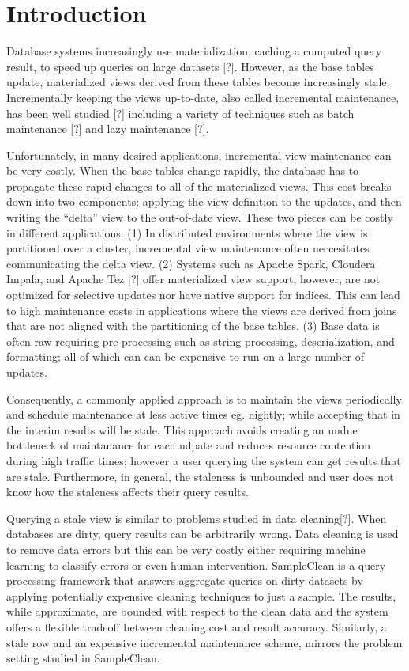 \section{Introduction}
Database systems increasingly use materialization, caching a computed
query result, to speed up queries on large datasets {[}?{]}. 
However, as the base tables update, materialized views derived from these tables
become increasingly stale. Incrementally keeping the views up-to-date,
also called incremental maintenance, has been well studied {[}?{]}
including a variety of techniques such as batch maintenance {[}?{]}
and lazy maintenance {[}?{]}. 

Unfortunately, in many desired applications, incremental view maintenance
can be very costly. 
When the base tables change rapidly, the database has to propagate these rapid changes to
all of the materialized views.  
This cost breaks down into two components: applying
the view definition to the updates, and then writing the ``delta''
view to the out-of-date view. These two pieces can be costly in different
applications. (1) In distributed environments where the view is partitioned
over a cluster, incremental view maintenance often neccesitates communicating
the delta view. (2) Systems such as Apache Spark, Cloudera Impala,
and Apache Tez {[}?{]} offer materialized view support, however, are
not optimized for selective updates nor have native support for indices.
This can lead to high maintenance costs in applications where the
views are derived from joins that are not aligned with the partitioning
of the base tables. (3) Base data is often raw requiring pre-processing
such as string processing, deserialization, and formatting; all of
which can can be expensive to run on a large number of updates. 

Consequently, a commonly applied approach is to maintain the views periodically and
schedule maintenance at less active times eg. nightly; while accepting
that in the interim results will be stale. This approach avoids creating
an undue bottleneck of maintanance for each udpate and reduces resource contention during high traffic times; 
however a user querying the system can get results that are stale.
Furthermore, in general, the staleness is unbounded and user does not know how the staleness affects their query results.

Querying a stale view is similar to problems studied in data cleaning{[}?{]}.
When databases are dirty, query results can be arbitrarily wrong.
Data cleaning is used to remove data errors but this can be very costly either 
requiring machine learning to classify errors or even human intervention.
SampleClean is a query processing framework that answers aggregate
queries on dirty datasets by applying potentially expensive cleaning
techniques to just a sample. The results, while approximate, are bounded
with respect to the clean data and the system offers a flexible tradeoff
between cleaning cost and result accuracy. Similarly, a stale row
and an expensive incremental maintenance scheme, mirrors the problem
setting studied in SampleClean. 

